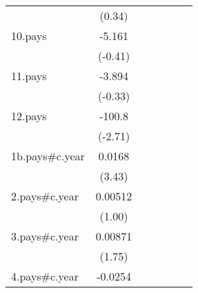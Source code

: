 {\begin{tabular}{l*{6}{c}}
                    &      (0.34)         &                     &                     &                     &                     &                     \\
[1em]
10.pays             &      -5.161         &                     &                     &                     &                     &                     \\
                    &     (-0.41)         &                     &                     &                     &                     &                     \\
[1em]
11.pays             &      -3.894         &                     &                     &                     &                     &                     \\
                    &     (-0.33)         &                     &                     &                     &                     &                     \\
[1em]
12.pays             &      -100.8\sym{**} &                     &                     &                     &                     &                     \\
                    &     (-2.71)         &                     &                     &                     &                     &                     \\
[1em]
1b.pays#c.year      &      0.0168\sym{***}&                     &                     &                     &                     &                     \\
                    &      (3.43)         &                     &                     &                     &                     &                     \\
[1em]
2.pays#c.year       &     0.00512         &                     &                     &                     &                     &                     \\
                    &      (1.00)         &                     &                     &                     &                     &                     \\
[1em]
3.pays#c.year       &     0.00871         &                     &                     &                     &                     &                     \\
                    &      (1.75)         &                     &                     &                     &                     &                     \\
[1em]
4.pays#c.year       &     -0.0254\sym{***}&                     &                     &                     &                     &                     \\

\end{tabular}}
